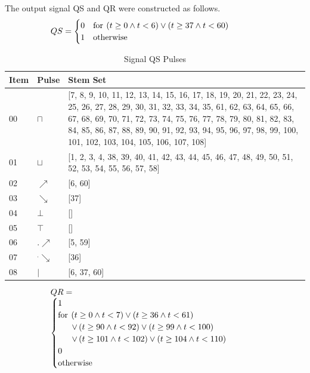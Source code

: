 \documentclass[10pt,journal]{IEEEtran}
\begin{document}
The output signal QS and QR were constructed as follows.
\begin{equation}
 \begin{minipage}{250pt}
\begin{flushleft} $\displaystyle QS = \begin{cases} 0 & \text{for}\: \left(t \geq 0 \wedge t < 6\right) \vee \left(t \geq 37 \wedge t < 60\right) \\1 & \text{otherwise} \end{cases}$  \end{flushleft}
 \end{minipage}
 \end{equation}
\begin{table}[H] \caption{Signal QS Pulses}\centering\begin{tabular}{|p{.4cm}|p{.5cm}|p{6.5cm}|}\hline Item&Pulse &Stem Set\\ \hline 00& \footnotesize$\sqcap$ & \footnotesize[7, 8, 9, 10, 11, 12, 13, 14, 15, 16, 17, 18, 19, 20, 21, 22, 23, 24, 25, 26, 27, 28, 29, 30, 31, 32, 33, 34, 35, 61, 62, 63, 64, 65, 66, 67, 68, 69, 70, 71, 72, 73, 74, 75, 76, 77, 78, 79, 80, 81, 82, 83, 84, 85, 86, 87, 88, 89, 90, 91, 92, 93, 94, 95, 96, 97, 98, 99, 100, 101, 102, 103, 104, 105, 106, 107, 108]\\ \hline 01& \footnotesize$\sqcup$ & \footnotesize[1, 2, 3, 4, 38, 39, 40, 41, 42, 43, 44, 45, 46, 47, 48, 49, 50, 51, 52, 53, 54, 55, 56, 57, 58]\\ \hline 02& \footnotesize$\nearrow$ & \footnotesize[6, 60]\\ \hline 03& \footnotesize$\searrow$ & \footnotesize[37]\\ \hline 04& \footnotesize$\bot$ & \footnotesize[]\\ \hline 05& \footnotesize$\top$ & \footnotesize[]\\ \hline 06& \footnotesize$.\nearrow$ & \footnotesize[5, 59]\\ \hline 07& \footnotesize$^.\searrow$ & \footnotesize[36]\\ \hline 08& \footnotesize$|$ & \footnotesize[6, 37, 60]\\ \hline \end{tabular} \end{table} 
\begin{equation}
 \begin{minipage}{250pt}
\begin{flushleft} $\displaystyle QR = \begin{cases} 1 & \\  \text{for}\: \left(t \geq 0 \wedge t < 7\right) \vee \left(t \geq 36 \wedge t < 61\right) \\ \quad \ \  \vee \left(t \geq 90 \wedge t < 92\right) \vee \left(t \geq 99 \wedge t < 100\right) \\ \quad \ \  \vee \left(t \geq 101 \wedge t < 102\right) \vee \left(t \geq 104 \wedge t < 110\right) \\0 & \\  \text{otherwise} \end{cases}$  \end{flushleft}
 \end{minipage}
 \end{equation}
\end{document}
